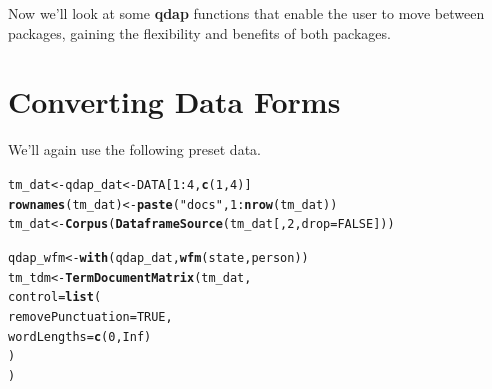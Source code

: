 \documentclass{article}\usepackage[]{graphicx}\usepackage[]{color}
\makeatletter
\newcommand{\hlnum}[1]{\textcolor[rgb]{0.686,0.059,0.569}{#1}}%
\newcommand{\hlstr}[1]{\textcolor[rgb]{0.192,0.494,0.8}{#1}}%
\newcommand{\hlopt}[1]{\textcolor[rgb]{0,0,0}{#1}}%
\newcommand{\hlstd}[1]{\textcolor[rgb]{0.345,0.345,0.345}{#1}}%
\newcommand{\hlkwb}[1]{\textcolor[rgb]{0.69,0.353,0.396}{#1}}%
\newcommand{\hlkwc}[1]{\textcolor[rgb]{0.333,0.667,0.333}{#1}}%
\newcommand{\hlkwd}[1]{\textcolor[rgb]{0.737,0.353,0.396}{\textbf{#1}}}%
\newenvironment{kframe}{%
 \def\at@end@of@kframe{}%
 \ifinner\ifhmode%
  \def\at@end@of@kframe{\end{minipage}}%
  \begin{minipage}{\columnwidth}%
 \fi\fi%
 \def\FrameCommand##1{\hskip\@totalleftmargin \hskip-\fboxsep
 \colorbox{shadecolor}{##1}\hskip-\fboxsep
     \hskip-\linewidth \hskip-\@totalleftmargin \hskip\columnwidth}%
 \MakeFramed {\advance\hsize-\width
   \@totalleftmargin\z@ \linewidth\hsize
   \@setminipage}}%
 {\par\unskip\endMakeFramed%
 \at@end@of@kframe}
\newenvironment{knitrout}{}{} %
\makeatother
\begin{document}
\begin{knitrout}
\color{fgcolor}\begin{kframe}


{\ttfamily\noindent\itshape\color{messagecolor}{\#\# A word-frequency matrix (16 terms, 5 groups)\\\#\# \\\#\# \\\#\# Non-/sparse entries\ \ \ \ \ \  : 17/63\\\#\# Sparsity\ \ \ \ \ \ \ \ \ \ \ \ \ \ \ \ \ \ : 79\%\\\#\# Maximal term length\ \ \ \ \ \  : 8\\\#\# Less than four characters : 56\%\\\#\# Hapax legomenon\ \ \ \ \ \ \ \ \ \  : 13(81\%)\\\#\# Dis legomenon\ \ \ \ \ \ \ \ \ \ \ \  : 3(19\%)\\\#\# Shannon's diversity index : 2.73}}\end{kframe}
\end{knitrout}


Now we'll look at some \textbf{qdap} functions that enable the user to move between packages, gaining the flexibility and benefits of both packages.


\section{Converting Data Forms}

\hspace{.4cm} We'll again use the following preset data.

\begin{knitrout}
\color{fgcolor}\begin{kframe}
\begin{alltt}
\hlstd{tm_dat} \hlkwb{<-} \hlstd{qdap_dat} \hlkwb{<-} \hlstd{DATA[}\hlnum{1}\hlopt{:}\hlnum{4}\hlstd{,} \hlkwd{c} \hlstd{(}\hlnum{1}\hlstd{,} \hlnum{4}\hlstd{) ]}
\hlkwd{rownames} \hlstd{(tm_dat)} \hlkwb{<-} \hlkwd{paste} \hlstd{(}\hlstr{"docs"}\hlstd{,} \hlnum{1}\hlopt{:} \hlkwd{nrow} \hlstd{(tm_dat))}
\hlstd{tm_dat} \hlkwb{<-} \hlkwd{Corpus} \hlstd{(} \hlkwd{DataframeSource} \hlstd{(tm_dat[,} \hlnum{2}\hlstd{,} \hlkwc{drop}\hlstd{=}\hlnum{FALSE}\hlstd{]))}

\hlstd{qdap_wfm} \hlkwb{<-} \hlkwd{with} \hlstd{(qdap_dat,} \hlkwd{wfm} \hlstd{(state, person))}
\hlstd{tm_tdm} \hlkwb{<-} \hlkwd{TermDocumentMatrix} \hlstd{(tm_dat,}
    \hlkwc{control} \hlstd{=} \hlkwd{list} \hlstd{(}
        \hlkwc{removePunctuation} \hlstd{=} \hlnum{TRUE}\hlstd{,}
        \hlkwc{wordLengths}\hlstd{=} \hlkwd{c} \hlstd{(}\hlnum{0}\hlstd{,} \hlnum{Inf}\hlstd{)}
    \hlstd{)}
\hlstd{)}
\end{alltt}
\end{kframe}
\end{knitrout}
\end{document}
